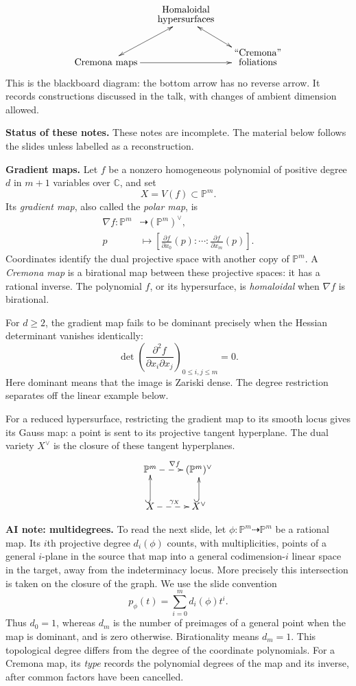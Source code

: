 $$
\xymatrix@C=1.5em@R=2em{
&\text{\shortstack{Homaloidal\\
hypersurfaces}}
\ar@{<->}[dl]\ar@{<->}[dr]&\\
\text{Cremona maps}\ar[rr]&&
\text{\shortstack{``Cremona''\\foliations}}
}
$$
This is the blackboard diagram:
the bottom arrow has
no reverse arrow. It records constructions
discussed in the talk, with changes of
ambient dimension allowed.

\medskip\noindent
\textbf{Status of these notes.}
These notes are incomplete.
The material below
follows the slides unless labelled
as a reconstruction.

\medskip\noindent
\textbf{Gradient maps.}
Let $f$ be a nonzero homogeneous
polynomial of positive degree $d$ in
$m+1$ variables over $\mathbb{C}$, and set
$$
X=V(f)\subset\mathbb{P}^m.
$$
Its \emph{gradient map}, also called the
\emph{polar map}, is
$$
\begin{aligned}
\nabla f:\mathbb{P}^m
&\dashrightarrow(\mathbb{P}^m)^\vee,\\
p&\longmapsto
\left[
\frac{\partial f}{\partial x_0}(p):
\cdots:
\frac{\partial f}{\partial x_m}(p)
\right].
\end{aligned}
$$
Coordinates identify the dual projective
space with another copy of
$\mathbb{P}^m$. A \emph{Cremona map} is
a birational map between these projective
spaces: it has a rational inverse.
The polynomial $f$, or its hypersurface,
is \emph{homaloidal} when $\nabla f$ is
birational.

For $d\geq2$, the gradient map fails to
be dominant precisely when the Hessian
determinant vanishes identically:
$$
\det\left(
\frac{\partial^2f}
{\partial x_i\partial x_j}
\right)_{0\leq i,j\leq m}=0.
$$
Here dominant means that the image is
Zariski dense. The degree restriction
separates off the linear example below.

For a reduced hypersurface, restricting
the gradient map to its smooth locus
gives its Gauss map: a point is sent to
its projective tangent hyperplane.
The dual variety $X^\vee$ is the closure
of these tangent hyperplanes.
$$
\xymatrix{
\mathbb{P}^m
\ar@{-->}[r]^{\nabla f}&
(\mathbb{P}^m)^\vee\\
X\ar@{^{(}->}[u]
\ar@{-->}[r]^{\gamma_X}&
X^\vee\ar@{^{(}->}[u]
}
$$

\medskip\noindent
\textbf{AI note: multidegrees.}
To read the next slide, let
$\phi:\mathbb{P}^m\dashrightarrow
\mathbb{P}^m$ be a rational map.
Its $i$th projective degree $d_i(\phi)$
counts, with multiplicities, points of a
general $i$-plane in the source that map
into a general codimension-$i$ linear
space in the target, away from the
indeterminacy locus. More precisely this
intersection is taken on the closure of
the graph. We use the slide convention
$$
p_\phi(t)=\sum_{i=0}^m d_i(\phi)t^i.
$$
Thus $d_0=1$, whereas $d_m$ is the
number of preimages of a general point
when the map is dominant, and is zero
otherwise. Birationality means $d_m=1$.
This topological degree differs from the
degree of the coordinate polynomials.
For a Cremona map, its \emph{type}
records the polynomial degrees of the
map and its inverse, after common factors
have been cancelled.

